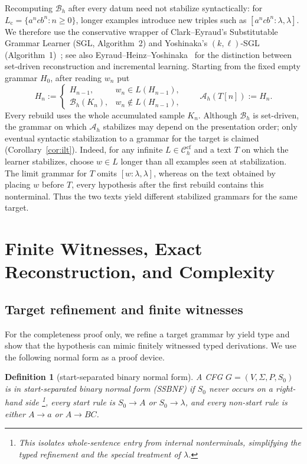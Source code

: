 \documentclass[11pt,a4paper]{article}
\newtheorem{definition}[theorem]{Definition}
\theoremstyle{remark}
\theoremstyle{plain}
\newcommand{\cf}{\mathrm{cf}}
\newcommand{\Ccf}[1]{\mathcal C_{#1}^{\cf}}
\begin{document}
Recomputing $\mathcal B_h$ after every datum need not stabilize
syntactically: for $L_{\mathrm c}=\{a^ncb^n:n\ge0\}$, longer examples
introduce new triples such as $[a^ncb^n:\lambda,\lambda]$.
We therefore use the conservative wrapper of Clark--Eyraud's
Substitutable Grammar Learner (SGL, Algorithm~2) and Yoshinaka's
$(k,\ell)$-SGL (Algorithm~1)~\cite{clark-eyraud2007,yoshinaka2008};
see also Eyraud--Heinz--Yoshinaka~\cite[Appendix]{eyraud-heinz-yoshinaka2016}
for the distinction between set-driven reconstruction and incremental learning.
Starting from the fixed empty grammar $H_0$, after reading $w_n$ put
\[
 H_n:=
 \begin{cases}
 H_{n-1},&w_n\in L(H_{n-1}),\\
 \mathcal B_h(K_n),&w_n\notin L(H_{n-1}),
 \end{cases}
 \qquad
 \mathcal A_h(T[n]):=H_n.
\]
Every rebuild uses the whole accumulated sample $K_n$.  Although
$\mathcal B_h$ is set-driven, the grammar on which $\mathcal A_h$ stabilizes
may depend on the presentation order; only eventual syntactic stabilization
to a grammar for the target is claimed (Corollary~\ref{cor:ilt}).
Indeed, for any infinite $L\in\Ccf{h}$ and a text $T$ on which the
learner stabilizes, choose $w\in L$ longer than all examples seen
at stabilization.  The limit grammar for $T$ omits
$[w:\lambda,\lambda]$, whereas on the text obtained by placing $w$
before $T$, every hypothesis after the first rebuild contains this
nonterminal.  Thus the two texts yield different stabilized grammars
for the same target.

\section{Finite Witnesses, Exact Reconstruction, and Complexity}
\label{sec:typing}


\subsection{Target refinement and finite witnesses}

For the completeness proof only, we refine a target grammar by yield type and
show that the hypothesis can mimic finitely witnessed typed derivations.  We use
the following normal form as a proof device.

\begin{definition}[start-separated binary normal form]
A CFG $G=(V,\Sigma,P,S_0)$ is in \emph{start-separated binary normal form}
(SSBNF) if $S_0$ never occurs on a right-hand side%
\footnote{This isolates whole-sentence entry from internal nonterminals, simplifying the typed refinement and the special treatment of $\lambda$.},
every start rule is $S_0\to A$ or $S_0\to\lambda$, and every non-start rule
is either $A\to a$ or $A\to BC$.
\end{definition}
\end{document}
